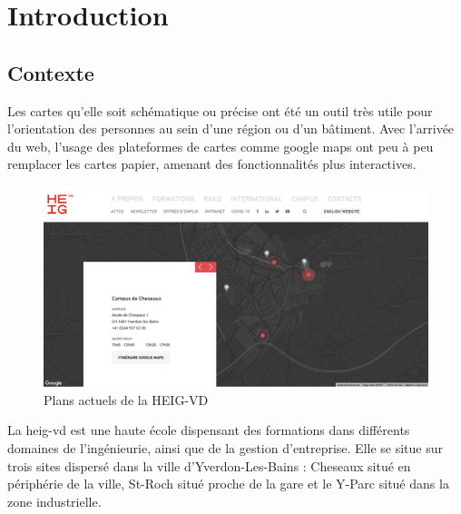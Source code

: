 \documentclass[
    iai, %
    il, %
]{heig-tb}
\begin{document}
\maketitle
\frontmatter
\clearemptydoublepage

\preamble
\authentification

\begin{abstract}
    
\end{abstract}

\clearemptydoublepage
{
    \tableofcontents
    \let\cleardoublepage\clearpage
    \listoffigures
    \let\cleardoublepage\clearpage
    \listoftables
}

\printnomenclature
\clearemptydoublepage
{}

\mainmatter
\chapter{Introduction}
\section{Contexte}
Les cartes qu'elle soit schématique ou précise ont été un outil très utile pour l'orientation des personnes au sein d'une région ou d'un bâtiment.
Avec l'arrivée du web, l'usage des plateformes de cartes comme google maps ont peu à peu remplacer les cartes papier, amenant des fonctionnalités plus interactives.

\begin{figure}[H]
    \centering
    \includegraphics{actual_heig_plan.png}
    \caption{Plans actuels de la HEIG-VD}
    \label{fig:heigCurrentMap}
\end{figure}
La \gls{heig-vd} est une haute école dispensant des formations dans différents domaines de l'ingénieurie, ainsi que de la gestion d'entreprise.
Elle se situe sur trois sites dispersé dans la ville d'Yverdon-Les-Bains
: Cheseaux  situé en périphérie de la ville, St-Roch situé proche de la gare et le Y-Parc situé dans la zone industrielle.
\end{document}
